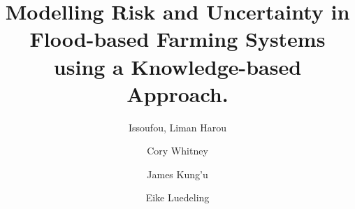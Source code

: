 \documentclass[]{elsarticle} %
\begin{document}
\begin{frontmatter}

  \title{Modelling Risk and Uncertainty in Flood-based Farming Systems using a Knowledge-based Approach.}
    \author[KU,ICRAF]{Issoufou, Liman Harou}
    \author[INRES]{Cory Whitney}
    \author[KU]{James Kung'u}
    \author[INRES]{Eike Luedeling}
      \address[KU]{Kenyatta University, Department of Environmental Sciences, P.O. Box 43844 00100 Nairobi, Kenya}
    \address[ICRAF]{World Agroforestry Centre (ICRAF), United Nations Avenue, Gigiri, P.O. Box 30677-00100, Nairobi, Kenya}
    \address[INRES]{University of Bonn, Department of Horticultural Sciences, Auf dem Hügel 6, D-53121, Bonn, Germany}
    \address[ZEF]{Center for Development research (ZEF), University of Bonn, Genscherallee 3, D-53113, Bonn, Germany}
    

\end{frontmatter}
\end{document}
